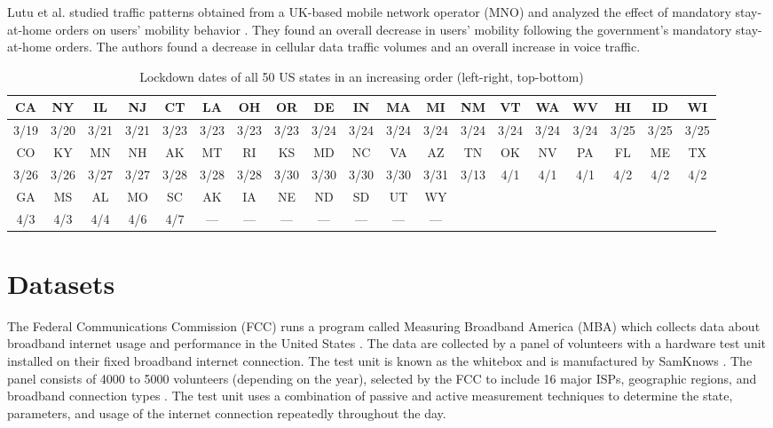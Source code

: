 \documentclass[conference,10pt]{IEEEtran}
\begin{document}
Lutu et al. studied traffic patterns obtained from a UK-based mobile network operator (MNO) and analyzed the effect of mandatory stay-at-home orders on users' mobility behavior \cite{lutu2020mobile}. They found an overall decrease in users' mobility following the government’s mandatory stay-at-home orders. The authors found a decrease in cellular data traffic volumes and an overall increase in voice traffic.

\begin{table}
  \centering
  \caption{Lockdown dates of all 50 US states in an increasing order (left-right, top-bottom)}
  \label{tab:state-lockdown}
  \begin{tabular}{ |c|c|c|c|c|c|c|c|c|c|c|c|c|c|c|c|c|c|c| }
    \hline
    CA   & NY   & IL   & NJ   & CT   & LA   & OH   & OR   & DE   & IN   & MA   & MI   & NM   & VT   & WA   & WV   & HI   & ID   & WI   \\
    \hline
    3/19 & 3/20 & 3/21 & 3/21 & 3/23 & 3/23 & 3/23 & 3/23 & 3/24 & 3/24 & 3/24 & 3/24 & 3/24 & 3/24 & 3/24 & 3/24 & 3/25 & 3/25 & 3/25 \\
    \hline\hline
    CO   & KY   & MN   & NH   & AK   & MT   & RI   & KS   & MD   & NC   & VA   & AZ   & TN   & OK   & NV   & PA   & FL   & ME   & TX   \\
    \hline
    3/26 & 3/26 & 3/27 & 3/27 & 3/28 & 3/28 & 3/28 & 3/30 & 3/30 & 3/30 & 3/30 & 3/31 & 3/13 & 4/1  & 4/1  & 4/1  & 4/2  & 4/2  & 4/2  \\
    \hline\hline
    GA   & MS   & AL   & MO   & SC   & AK   & IA   & NE   & ND   & SD   & UT   & WY   & \multicolumn{7}{|c|}{}                         \\
    \hline
    4/3  & 4/3  & 4/4  & 4/6  & 4/7  & ---  & ---  & ---  & ---  & ---  & ---  & ---  & \multicolumn{7}{|c|}{}                         \\
    \hline
  \end{tabular}
\end{table}


\section{Datasets}
\label{sec:datasets}

The Federal Communications Commission (FCC) runs a program called Measuring Broadband America (MBA) which collects data about broadband internet usage and performance in the United States \cite{mba}. The data are collected by a panel of volunteers with a hardware test unit installed on their fixed broadband internet connection. The test unit is known as the whitebox and is manufactured by SamKnows \cite{sam}. The panel consists of 4000 to 5000 volunteers (depending on the year), selected by the FCC to include 16 major ISPs, geographic regions, and broadband connection types \cite{fcc-report-appendix}. The test unit uses a combination of passive and active measurement techniques to determine the state, parameters, and usage of the internet connection repeatedly throughout the day.
\end{document}
